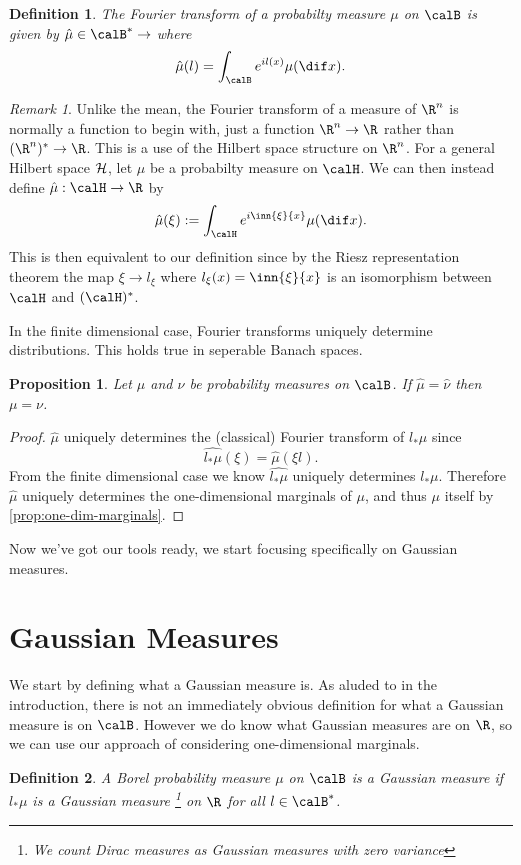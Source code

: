 \documentclass[fontsize=12pt, DIV=10]{scrreprt}
\theoremstyle{mydefn}
\newtheorem{defn}{Definition}
\newtheorem{prop}{Proposition}
\theoremstyle{remark}
\newtheorem{remark}{Remark}
\newcommand{\defeq}{:=}
\let\C\relax
\newcommand{\C}{\mathbb C}
\begin{document}
\begin{defn}
	The \emph{Fourier transform} of a probabilty measure $\mu$ on $\calB$ is given by $\hat{\mu} \in \calB^* \to \C$ where
	\begin{equation}
		\hat{\mu}(l) = \int_{\calB} e^{i l(x)} \mu(\dif x).
	\end{equation}
\end{defn}
\begin{remark}
	Unlike the mean, the Fourier transform of a measure of $\R^n$ is normally a function to begin with, just a function $\R^n \to \R$ rather than $(\R^n)^* \to \R$. This is a use of the Hilbert space structure on $\R^n$. For a general Hilbert space $\cal H$, let $\mu$ be a probabilty measure on $\calH$. We can then instead define $\hat{\mu}: \calH \to \R$ by
	\begin{equation}
		\hat{\mu}(\xi) \defeq \int_{\calH} e^{i \inn{\xi}{x}} \mu(\dif x).
	\end{equation}
	This is then equivalent to our definition since by the Riesz representation theorem the map $\xi \to l_{\xi}$ where $l_{\xi}(x) = \inn{\xi}{x}$ is an isomorphism between $\calH$ and $(\calH)^*$.
\end{remark}

In the finite dimensional case, Fourier transforms uniquely determine distributions. This holds true in seperable Banach spaces.
\begin{prop}
	Let $\mu$ and $\nu$ be probability measures on $\calB$. If $\hat{\mu} = \hat{\nu}$ then $\mu = \nu$.
\end{prop}
\begin{proof}
	$\hat{\mu}$ uniquely determines the (classical) Fourier transform of $l_* \mu$ since
	\begin{equation}
		\widehat{l_* \mu}(\xi) = \hat{\mu}(\xi l).
	\end{equation}
	From the finite dimensional case we know $\widehat{l_* \mu}$ uniquely determines $l_* \mu$. Therefore $\hat{\mu}$ uniquely determines the one-dimensional marginals of $\mu$, and thus $\mu$ itself by \vref{prop:one-dim-marginals}.
\end{proof}

Now we've got our tools ready, we start focusing specifically on Gaussian measures.

\section{Gaussian Measures}

We start by defining what a Gaussian measure is. As aluded to in the introduction, there is not an immediately obvious definition for what a Gaussian measure is on $\calB$. However we do know what Gaussian measures are on $\R$, so we can use our approach of considering one-dimensional marginals.
\begin{defn}
	A Borel probability measure $\mu$ on $\calB$ is a \emph{Gaussian measure} if $l_* \mu$ is a Gaussian measure \footnote{We count Dirac measures as Gaussian measures with zero variance} on $\R$ for all $l \in \calB^*$.
\end{defn}
\end{document}
